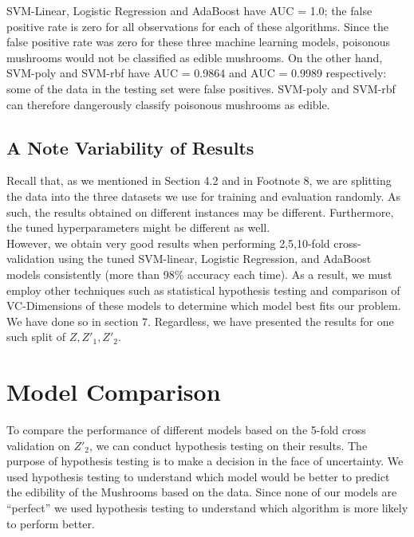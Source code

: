 \documentclass[fleqn]{article}
\begin{document}
    SVM-Linear, Logistic Regression and AdaBoost have AUC = 1.0; the false positive rate is zero for all observations for each of these algorithms. Since the false positive rate was zero for these three machine learning models, poisonous mushrooms would not be classified as edible mushrooms. On the other hand, SVM-poly and SVM-rbf have AUC = 0.9864 and AUC = 0.9989 respectively: some of the data in the testing set were false positives. SVM-poly and SVM-rbf can therefore dangerously classify poisonous mushrooms as edible.

    \subsection{A Note Variability of Results}
    Recall that, as we mentioned in Section 4.2 and in Footnote 8, we are splitting the
    data into the three datasets we use for training and evaluation randomly. As such, the
    results obtained on different instances may be different. Furthermore, the tuned
    hyperparameters might be different as well.\\

    However, we obtain very good results when performing 2,5,10-fold cross-validation using the
    tuned SVM-linear, Logistic Regression, and AdaBoost models consistently (more than 98\%
    accuracy  each time). As a result, we must employ other techniques such as statistical
    hypothesis testing and comparison of VC-Dimensions of these models to determine which
    model best fits our problem. We have done so in section 7. Regardless, we have presented
    the results for one such split of $ Z, Z'_1, Z'_2 $.

    \section{Model Comparison}
    To compare the performance of different models based on the 5-fold cross validation on
    $ Z'_2 $, we can conduct hypothesis testing on their results. The purpose of hypothesis
    testing is to make a decision in the face of uncertainty. We used hypothesis testing
    to understand which model would be better to predict the edibility of the Mushrooms
    based on the data. Since none of our models are “perfect” we used hypothesis testing
    to understand which algorithm is more likely to perform better.
\end{document}

